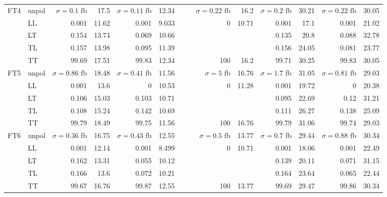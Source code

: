 \begin{table}[h]
{\begin{tabular}{llrrrrrrrrrrrr}
\midrule
\multirow{5}{*}{FT4}
 & unpol & $\sigma = \num{0.1}$ fb & \num{17.5} & $\sigma = \num{0.11}$ fb & \num{12.34} &  &  & $\sigma = \num{0.22}$ fb & \num{16.2} & $\sigma = \num{0.2}$ fb & \num{30.21} & $\sigma = \num{0.22}$ fb & \num{30.05} \\
 & LL & \num{0.001} & \num{11.62} & \num{0.001} & \num{9.033} &  &  & \num{0} & \num{10.71} & \num{0.001} & \num{17.1} & \num{0.001} & \num{21.02} \\
 & LT & \num{0.154} & \num{13.74} & \num{0.069} & \num{10.66} &  &  &  &  & \num{0.135} & \num{20.8} & \num{0.088} & \num{32.78} \\
 & TL & \num{0.157} & \num{13.98} & \num{0.095} & \num{11.39} &  &  &  &  & \num{0.156} & \num{24.05} & \num{0.081} & \num{23.77} \\
 & TT & \num{99.69} & \num{17.51} & \num{99.83} & \num{12.34} &  &  & \num{100} & \num{16.2} & \num{99.71} & \num{30.25} & \num{99.83} & \num{30.05} \\
\midrule
\multirow{5}{*}{FT5}
 & unpol & $\sigma = \num{0.86}$ fb & \num{18.48} & $\sigma = \num{0.41}$ fb & \num{11.56} &  &  & $\sigma = \num{5}$ fb & \num{16.76} & $\sigma = \num{1.7}$ fb & \num{31.05} & $\sigma = \num{0.81}$ fb & \num{29.03} \\
 & LL & \num{0.001} & \num{13.6} & \num{0} & \num{10.53} &  &  & \num{0} & \num{11.28} & \num{0.001} & \num{19.72} & \num{0} & \num{20.38} \\
 & LT & \num{0.106} & \num{15.03} & \num{0.103} & \num{10.71} &  &  &  &  & \num{0.095} & \num{22.69} & \num{0.12} & \num{31.21} \\
 & TL & \num{0.108} & \num{15.24} & \num{0.142} & \num{10.69} &  &  &  &  & \num{0.111} & \num{26.27} & \num{0.138} & \num{25.09} \\
 & TT & \num{99.79} & \num{18.49} & \num{99.75} & \num{11.56} &  &  & \num{100} & \num{16.76} & \num{99.79} & \num{31.06} & \num{99.74} & \num{29.03} \\
\midrule
\multirow{5}{*}{FT6}
 & unpol & $\sigma = \num{0.36}$ fb & \num{16.75} & $\sigma = \num{0.43}$ fb & \num{12.55} &  &  & $\sigma = \num{0.5}$ fb & \num{13.77} & $\sigma = \num{0.7}$ fb & \num{29.44} & $\sigma = \num{0.88}$ fb & \num{30.34} \\
 & LL & \num{0.001} & \num{12.14} & \num{0.001} & \num{8.499} &  &  & \num{0} & \num{10.71} & \num{0.001} & \num{18.06} & \num{0.001} & \num{22.49} \\
 & LT & \num{0.162} & \num{13.31} & \num{0.055} & \num{10.12} &  &  &  &  & \num{0.139} & \num{20.11} & \num{0.071} & \num{31.15} \\
 & TL & \num{0.166} & \num{13.6} & \num{0.072} & \num{10.21} &  &  &  &  & \num{0.164} & \num{23.64} & \num{0.065} & \num{22.44} \\
 & TT & \num{99.67} & \num{16.76} & \num{99.87} & \num{12.55} &  &  & \num{100} & \num{13.77} & \num{99.69} & \num{29.47} & \num{99.86} & \num{30.34} \\
\bottomrule
\end{tabular}
}%
\end{table}